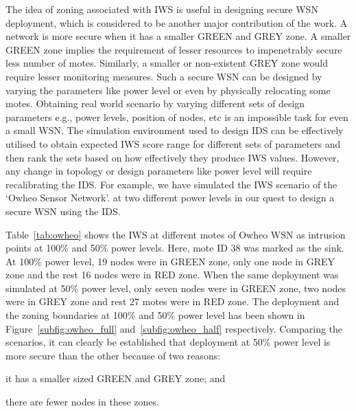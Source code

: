 \documentclass[conference]{IEEEtran}
\begin{document}
The idea of zoning associated with IWS is useful in designing secure WSN deployment, which is considered to be another major contribution of the work.
A network is more secure when it has a smaller GREEN and GREY zone.
A smaller GREEN zone implies the requirement of lesser resources to impenetrably secure less number of motes.
Similarly, a smaller or non-existent GREY zone would require lesser monitoring measures.
Such a secure WSN can be designed by varying the parameters like power level or even by physically relocating some motes.
Obtaining real world scenario by varying different sets of design parameters e.g., power levels, position of nodes, etc is an impossible task for even a small WSN.
The simulation environment used to design IDS can be effectively utilised to obtain expected IWS score range for different sets of parameters and then rank the sets based on how effectively they produce IWS values. 
However, any change in topology or design parameters like power level will require recalibrating the IDS. 
For example, we have simulated the IWS scenario of the `Owheo Sensor Network'.
at two different power levels in our quest to design a secure WSN using the IDS.

Table~\ref{tab:owheo} shows the IWS at different motes of Owheo WSN as intrusion points at 100\% and 50\% power levels. 
Here, mote ID 38 was marked as the sink.
At 100\% power level, 19 nodes were in GREEN zone, only one node in GREY zone and the rest 16 nodes were in RED zone.
When the same deployment was simulated at 50\% power level, only seven nodes were in GREEN zone, two nodes were in GREY zone and rest 27 motes were in RED zone.
The deployment and the zoning boundaries at 100\% and  50\% power level has been shown in Figure~\ref{subfig:owheo_full} and~\ref{subfig:owheo_half} respectively.
Comparing the scenarios, it can clearly be established that deployment at 50\% power level is more secure than the other because of two reasons:
\begin{inparaenum}
\item it has a smaller sized GREEN and GREY zone; and 
\item there are fewer nodes in these zones. 
\end{inparaenum}
\end{document}
